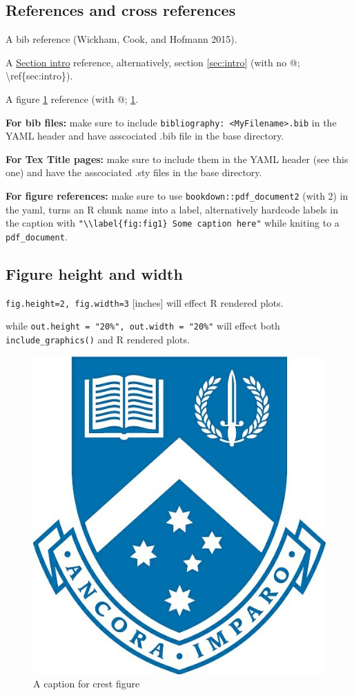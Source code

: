 \documentclass[11,]{article}
\begin{document}
\hypertarget{references-and-cross-references}{%
\subsection{References and cross references}\label{references-and-cross-references}}

A bib reference (Wickham, Cook, and Hofmann 2015).

A \protect\hyperlink{sec:intro}{Section intro} reference, alternatively, section \ref{sec:intro} (with no @; \textbackslash ref\{sec:intro\}).

A figure \ref{fig:crest} reference (with @; \ref{fig:crest}.

\textbf{For bib files:} make sure to include \texttt{bibliography:\ \textless{}MyFilename\textgreater{}.bib} in the YAML header and have asscociated .bib file in the base directory.

\textbf{For Tex Title pages:} make sure to include them in the YAML header (see this one) and have the asscociated .sty files in the base directory.

\textbf{For figure references:} make sure to use \texttt{bookdown::pdf\_document2} (with 2) in the yaml, turns an R chunk name into a label, alternatively hardcode labels in the caption with \texttt{"\textbackslash{}\textbackslash{}label\{fig:fig1\}\ Some\ caption\ here"} while kniting to a \texttt{pdf\_document}.

\hypertarget{sec2:subsection}{%
\subsection{Figure height and width}\label{sec2:subsection}}

\texttt{fig.height=2,\ fig.width=3} {[}inches{]} will effect R rendered plots.

while \texttt{out.height\ =\ "20\%",\ out.width\ =\ "20\%"} will effect both \texttt{include\_graphics()} and R rendered plots.

\begin{figure}

{\centering \includegraphics[width=0.2\linewidth,height=0.2\textheight]{figures/can_con/crest} 

}

\caption{A caption for crest figure}\label{fig:crest}
\end{figure}
\end{document}
